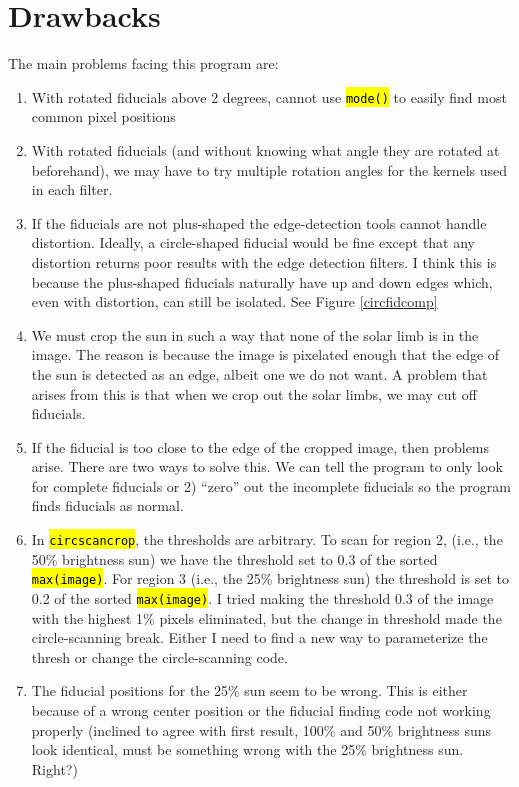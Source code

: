 \documentclass[10pt]{article}
\begin{document}
\section{Drawbacks}

    The main problems facing this program are:

    \begin{enumerate}
        \item With rotated fiducials above 2 degrees, cannot use \hl{\texttt{mode()}} to easily find most common pixel positions
        \item With rotated fiducials (and without knowing what angle they are rotated at beforehand), we may have to try multiple rotation angles for the kernels used in each filter.
        \item If the fiducials are not plus-shaped the edge-detection tools cannot handle distortion. Ideally, a circle-shaped fiducial would be fine except that any distortion returns poor results with the edge detection filters. I think this is because the plus-shaped fiducials naturally have up and down edges which, even with distortion, can still be isolated. See Figure \ref{circfidcomp}
        \item We must crop the sun in such a way that none of the solar limb is in the image. The reason is because the image is pixelated enough that the edge of the sun is detected as an edge, albeit one we do not want. A problem that arises from this is that when we crop out the solar limbs, we may cut off fiducials.
        \item If the fiducial is too close to the edge of the cropped image, then problems arise. There are two ways to solve this. We can tell the program to only look for complete fiducials or 2) ``zero'' out the incomplete fiducials so the program finds fiducials as normal.
        \item In \hl{\texttt{circscancrop}}, the thresholds are arbitrary. To scan for region 2, (i.e., the 50\% brightness sun) we have the threshold set to 0.3 of the sorted \hl{\texttt{max(image)}}. For region 3 (i.e., the 25\% brightness sun) the threshold is set to 0.2 of the sorted \hl{\texttt{max(image)}}. I tried making the threshold 0.3 of the image with the highest 1\% pixels eliminated, but the change in threshold made the circle-scanning break. Either I need to find a new way to parameterize the thresh or change the circle-scanning code. 
        \item The fiducial positions for the 25\% sun seem to be wrong. This is either because of a wrong center position or the fiducial finding code not working properly (inclined to agree with first result, 100\% and 50\% brightness suns look identical, must be something wrong with the 25\% brightness sun. Right?)
    \end{enumerate}
\end{document}
